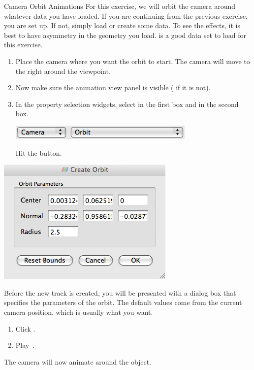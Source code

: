 \begin{exercise}{Camera Orbit Animations}
  \label{ex:CameraOrbitAnimations}%
  For this exercise, we will orbit the camera around whatever data you have
  loaded.  If you are continuing from the previous exercise, you are set
  up.  If not, simply load or create some data.  To see the effects, it is
  best to have asymmetry in the geometry you load.   is a good
  data set to load for this exercise.

  \begin{enumerate}
  \item Place the camera where you want the orbit to start.  The camera
    will move to the right around the viewpoint.
  \item Now make sure the animation view panel is visible ( \ra
     if it is not).
  \item In the property selection widgets, select  in the first
    box and  in the second box.
    \begin{inlinefig}
      \includegraphics[height=1.5\baselineskip]{images/AddCameraOrbit}
    \end{inlinefig}
    Hit the  button.
    \savecounter
  \end{enumerate}

  \begin{inlinefig}
    \includegraphics[width=.66\scw]{images/CreateOrbitDialog}
  \end{inlinefig}

  Before the new track is created, you will be presented with a dialog box
  that specifies the parameters of the orbit.  The default values come from
  the current camera position, which is usually what you want.

  \begin{enumerate}
    \restorecounter
  \item Click .
  \item Play~\vcrPlay.
  \end{enumerate}

  The camera will now animate around the object.
\end{exercise}


